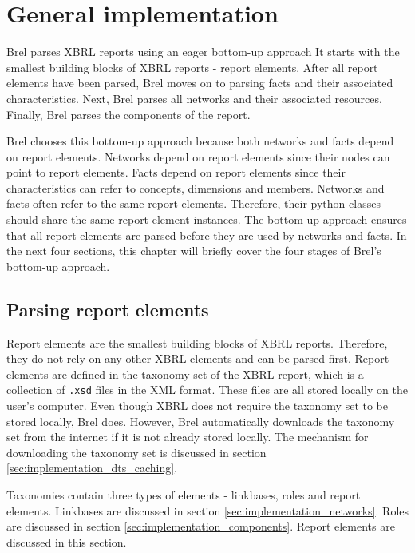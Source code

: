 \section{General implementation}
\label{sec:implementation_general}

Brel parses XBRL reports using an eager bottom-up approach
It starts with the smallest building blocks of XBRL reports - report elements.
After all report elements have been parsed, Brel moves on to parsing facts and their associated characteristics.
Next, Brel parses all networks and their associated resources.
Finally, Brel parses the components of the report.

Brel chooses this bottom-up approach because both networks and facts depend on report elements.
Networks depend on report elements since their nodes can point to report elements.
Facts depend on report elements since their characteristics can refer to concepts, dimensions and members.
Networks and facts often refer to the same report elements.
Therefore, their python classes should share the same report element instances.
The bottom-up approach ensures that all report elements are parsed before they are used by networks and facts.
In the next four sections, this chapter will briefly cover the four stages of Brel's bottom-up approach.

\subsection{Parsing report elements}
\label{sec:implementation_report_elements}

Report elements are the smallest building blocks of XBRL reports.
Therefore, they do not rely on any other XBRL elements and can be parsed first.
Report elements are defined in the taxonomy set of the XBRL report, which is a collection of \texttt{.xsd} files in the XML format.
These files are all stored locally on the user's computer.
Even though XBRL does not require the taxonomy set to be stored locally, Brel does.
However, Brel automatically downloads the taxonomy set from the internet if it is not already stored locally.
The mechanism for downloading the taxonomy set is discussed in section \ref{sec:implementation_dts_caching}.

Taxonomies contain three types of elements - linkbases, roles and report elements.
Linkbases are discussed in section \ref{sec:implementation_networks}.
Roles are discussed in section \ref{sec:implementation_components}.
Report elements are discussed in this section.

